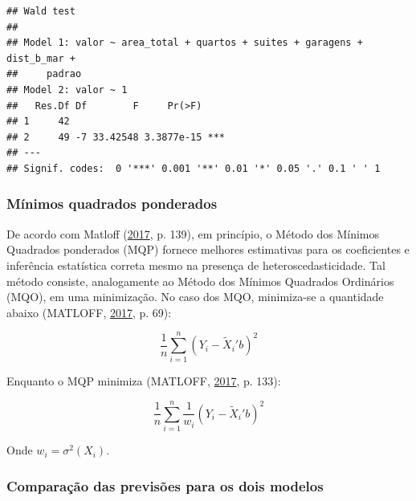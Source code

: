 \documentclass[a4paper]{article}
\begin{document}
\begin{verbatim}
## Wald test
## 
## Model 1: valor ~ area_total + quartos + suites + garagens + dist_b_mar + 
##     padrao
## Model 2: valor ~ 1
##   Res.Df Df        F     Pr(>F)    
## 1     42                           
## 2     49 -7 33.42548 3.3877e-15 ***
## ---
## Signif. codes:  0 '***' 0.001 '**' 0.01 '*' 0.05 '.' 0.1 ' ' 1
\end{verbatim}

\subsubsection{Mínimos quadrados
ponderados}\label{minimos-quadrados-ponderados}

De acordo com Matloff (\protect\hyperlink{ref-matloff2017}{2017}, p.
139), em princípio, o Método dos Mínimos Quadrados ponderados (MQP)
fornece melhores estimativas para os coeficientes e inferência
estatística correta mesmo na presença de heteroscedasticidade. Tal
método consiste, analogamente ao Método dos Mínimos Quadrados Ordinários
(MQO), em uma minimização. No caso dos MQO, minimiza-se a quantidade
abaixo (MATLOFF, \protect\hyperlink{ref-matloff2017}{2017}, p. 69):

\[\frac{1}{n} \sum_{i=1}^{n} (Y_i - \tilde{X}_i'b)^2\]

Enquanto o MQP minimiza (MATLOFF,
\protect\hyperlink{ref-matloff2017}{2017}, p. 133):

\[\frac{1}{n} \sum_{i=1}^{n} \frac{1}{w_i} (Y_i - \tilde{X}_i'b)^2\]

Onde \(w_i = \sigma^2(X_i)\).

\subsubsection{Comparação das previsões para os dois
modelos}\label{comparacao-das-previsoes-para-os-dois-modelos}
\end{document}
